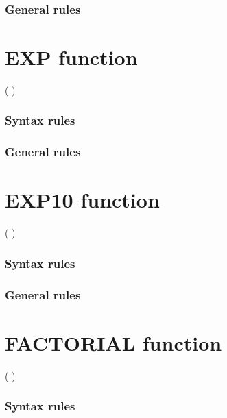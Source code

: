 \subsubsection{General rules}

\section{EXP function}

\begin{syntax}
    ( \argument )
\end{syntax}

\subsubsection{Syntax rules}

\subsubsection{General rules}

\section{EXP10 function}

\begin{syntax}
    ( \argument )
\end{syntax}

\subsubsection{Syntax rules}

\subsubsection{General rules}

\section{FACTORIAL function}

\begin{syntax}
    ( \argument )
\end{syntax}

\subsubsection{Syntax rules}

